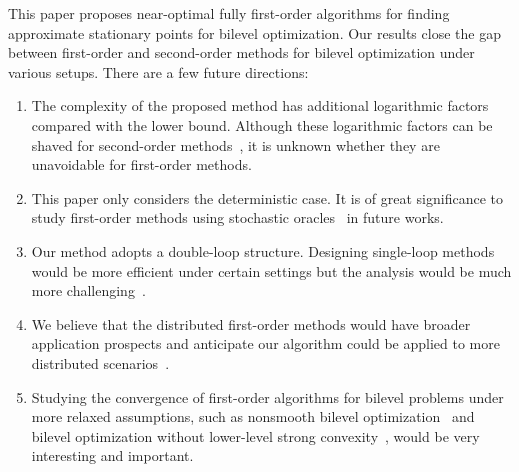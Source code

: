\documentclass{article}
\begin{document}
This paper proposes near-optimal fully first-order algorithms for finding approximate stationary points for bilevel optimization. 
Our results close the gap between first-order and second-order methods for bilevel optimization under various setups.
There are a few future directions:
\begin{enumerate}
\item  The complexity of the proposed method has additional logarithmic factors compared with the lower bound. 
Although these logarithmic factors can be shaved for second-order methods~\cite{ji2021bilevel},
it is unknown whether they are unavoidable for first-order methods.
\item This paper only considers the deterministic case.  It is of great significance to study first-order methods using stochastic oracles~\cite{khanduri2021near,ji2021bilevel,kwon2023fully} in future works.
\item Our method adopts a double-loop structure. Designing single-loop methods would be more efficient under certain settings but the analysis would be much more challenging~\cite{lin2020gradient,hong2023two,khanduri2021near,chen2022single,kwon2023fully,chen2021closing,chen2023optimal}.
\item We believe that the distributed first-order methods would have broader application prospects and anticipate our algorithm could be applied to more distributed scenarios~\cite{lian2017can,alistarh2018byzantine,bernstein2018signsgd,yuan2022decentralized,wang2022fine,gandikota2021vqsgd,alistarh2018convergence,ye2018communication}.
\item Studying the convergence of first-order algorithms for bilevel problems under more relaxed assumptions, such as nonsmooth bilevel optimization~\cite{lu2023first} and bilevel optimization without lower-level strong convexity~\cite{sow2022constrained,liu2021towards,liu2021value,liu2020generic}, would be very interesting and important.
\end{enumerate}




\clearpage
\appendix

\end{document}
